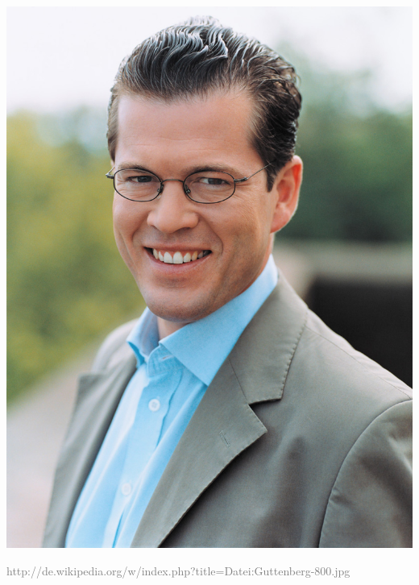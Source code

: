 

\begin{frame}
	\begin{center}
	\includegraphics[height=0.85 \textheight]{images/gutti.jpg}
	\end{center}
	
	\textcolor{gray}{\tiny{http://de.wikipedia.org/w/index.php?title=Datei:Guttenberg-800.jpg}}
\end{frame}

